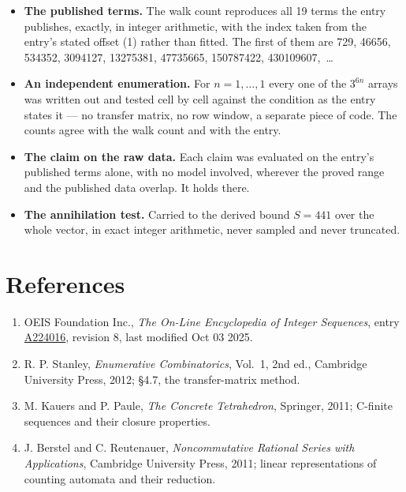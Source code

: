 \documentclass[11pt]{article}
\theoremstyle{definition}
\begin{document}
\begin{itemize}

\item {\bfseries The published terms.} The walk count reproduces all 19 terms the entry publishes, exactly, in integer arithmetic, with the index taken from the entry's stated offset (1) rather than fitted. The first of them are 729, 46656, 534352, 3094127, 13275381, 47735665, 150787422, 430109607,~\dots

\item {\bfseries An independent enumeration.} For $n = 1,\dots,1$ every one of the $3^{6n}$ arrays was written out and tested cell by cell against the condition as the entry states it --- no transfer matrix, no row window, a separate piece of code. The counts agree with the walk count and with the entry.

\item {\bfseries The claim on the raw data.} Each claim was evaluated on the entry's published terms alone, with no model involved, wherever the proved range and the published data overlap. It holds there.

\item {\bfseries The annihilation test.} Carried to the derived bound $S = 441$ over the whole vector, in exact integer arithmetic, never sampled and never truncated.

\end{itemize}

\section{References}

\begin{enumerate}

\item OEIS Foundation Inc., \emph{The On-Line Encyclopedia of Integer Sequences}, entry \href{https://oeis.org/A224016}{A224016}, revision 8, last modified Oct 03 2025.

\item R. P. Stanley, \emph{Enumerative Combinatorics}, Vol.~1, 2nd ed., Cambridge University Press, 2012; \S4.7, the transfer-matrix method.

\item M. Kauers and P. Paule, \emph{The Concrete Tetrahedron}, Springer, 2011; C-finite sequences and their closure properties.

\item J. Berstel and C. Reutenauer, \emph{Noncommutative Rational Series with Applications}, Cambridge University Press, 2011; linear representations of counting automata and their reduction.

\end{enumerate}
\end{document}
